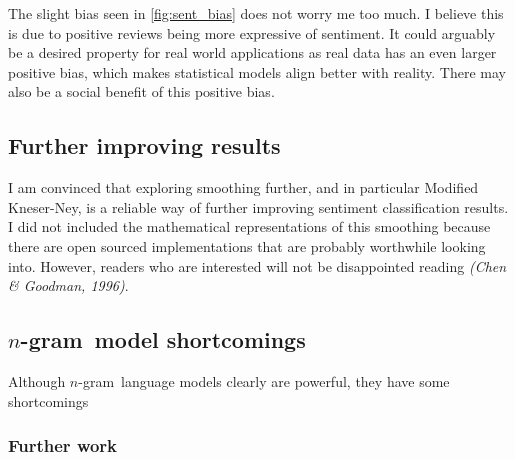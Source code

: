 \documentclass[a4paper,11pt]{kth-mag}
\newcommand{\ngram}{$n$-gram}
\begin{document}
The slight bias seen in \ref{fig:sent_bias} does not worry me too much.
I believe this is due to positive reviews being more expressive of sentiment. It could arguably be a desired property for real world applications as real data has an even larger positive bias, which makes statistical models align better with reality. There may also be a social benefit of this positive bias.


\subsection{Further improving results}
I am convinced that exploring smoothing further, and in particular Modified Kneser-Ney,
is a reliable way of further improving sentiment classification results. I did not included the
mathematical representations of this smoothing because there are open sourced implementations
that are probably worthwhile looking into. However, readers who are interested will not
be disappointed reading \emph{(Chen \& Goodman, 1996)}.





\subsection{\ngram~model shortcomings}
Although \ngram~language models clearly are powerful, they have some shortcomings



\subsubsection{Further work}


\end{document}
